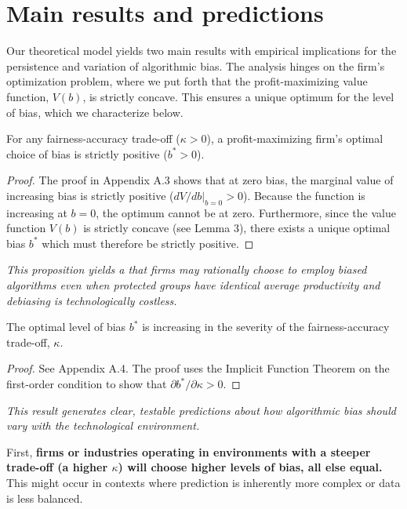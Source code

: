 \section{Main results and predictions}

Our theoretical model yields two main results with empirical implications for the persistence and variation of algorithmic bias. The analysis hinges on the firm's optimization problem, where we put forth that the profit-maximizing value function, $V(b)$, is strictly concave. This ensures a unique optimum for the level of bias, which we characterize below.

\begin{proposition}
    \label{prop:existence}
    For any fairness-accuracy trade-off ($\kappa > 0$), a profit-maximizing firm's optimal choice of bias is strictly positive ($b^* > 0$).
    \end{proposition}
    \begin{proof}
        The proof in Appendix A.3 shows that at zero bias, the marginal value of increasing bias is strictly positive ($dV/db|_{b=0} > 0$). Because the function is increasing at $b=0$, the optimum cannot be at zero. Furthermore, since the value function $V(b)$ is strictly concave (see Lemma 3), there exists a unique optimal bias $b^*$ which must therefore be strictly positive.
    \end{proof}
    
    \textit{This proposition yields a that firms may rationally choose to employ biased algorithms even when protected groups have identical average productivity and debiasing is technologically costless.}

    \begin{proposition}
        \label{prop:comparative_static}
        The optimal level of bias $b^*$ is increasing in the severity of the fairness-accuracy trade-off, $\kappa$.
        \end{proposition}
        \begin{proof}
        See Appendix A.4. The proof uses the Implicit Function Theorem on the first-order condition to show that $\partial b^*/\partial\kappa > 0$.
        \end{proof}
        
        \textit{This result generates clear, testable predictions about how algorithmic bias should vary with the technological environment.}
        
        First, \textbf{firms or industries operating in environments with a steeper trade-off (a higher $\kappa$) will choose higher levels of bias, all else equal.} This might occur in contexts where prediction is inherently more complex or data is less balanced.

